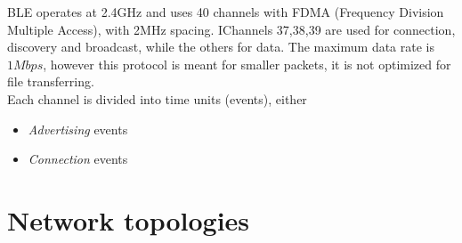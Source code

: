 BLE operates at 2.4GHz and uses 40 channels with FDMA (Frequency Division Multiple Access), with 2MHz spacing. IChannels 37,38,39 are used for connection, discovery and broadcast, while the others for data.
The maximum data rate is $1Mbps$, however this protocol is meant for smaller packets, it is not optimized for file transferring.\\
Each channel is divided into time units (events), either
\begin{itemize}
   \item \textit{Advertising} events
   \item \textit{Connection} events
\end{itemize}


\section{Network topologies}
